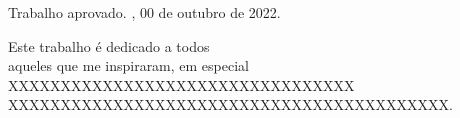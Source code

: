 \documentclass[
	12pt,				%
	openright,			%
	oneside,			%
	a4paper,			%
	english,			%
	french,				%
	spanish,			%
	brazil,				%
	]{abntex2}
\begin{document}
%
% 
%
\begin{folhadeaprovacao}

  \begin{center}
    {\ABNTEXchapterfont\large\imprimirautor}

    \vspace*{\fill}\vspace*{\fill}
    {\ABNTEXchapterfont\bfseries\Large\imprimirtitulo}
    \vspace*{\fill}
    
    \hspace{.45\textwidth}
    \begin{minipage}{.5\textwidth}
        \imprimirpreambulo
    \end{minipage}%
    \vspace*{\fill}
   \end{center}
    
   Trabalho aprovado. \imprimirlocal, 00 de outubro de 2022.

      
   \begin{center}
    \vspace*{0.5cm}
    {\large\imprimirlocal}
    \par
    {\large\imprimirdata}
    \vspace*{1cm}
  \end{center}
  
\end{folhadeaprovacao}


\begin{dedicatoria}
   \vspace*{\fill}
	\begin{flushright}
        Este trabalho é dedicado a todos\\ 
       aqueles que me inspiraram, em especial\\ 
       XXXXXXXXXXXXXXXXXXXXXXXXXXXXXXXXX \\
       XXXXXXXXXXXXXXXXXXXXXXXXXXXXXXXXXXXXXXXXXX.
    \end{flushright}
\end{dedicatoria}
\end{document}
